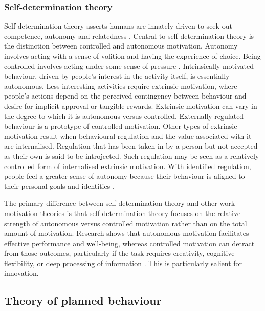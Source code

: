 
\subsubsection{Self-determination theory}

Self-determination theory asserts humans are innately driven to seek out competence, autonomy and relatedness \citep{ryan2000self}. Central to self-determination theory is the distinction between controlled and autonomous motivation. Autonomy involves acting with a sense of volition and having the experience of choice. Being controlled involves acting under some sense of pressure \citep{gagne2005self}. Intrinsically motivated behaviour, driven by people’s interest in the activity itself, is essentially autonomous. Less interesting activities require extrinsic motivation, where people's actions depend on the perceived contingency between behaviour and desire for implicit approval or tangible rewards. Extrinsic motivation can vary in the degree to which it is autonomous versus controlled. Externally regulated behaviour is a prototype of controlled motivation. Other types of extrinsic motivation result when behavioural regulation and the value associated with it are internalised. Regulation that has been taken in by a person but not accepted as their own is said to be introjected. Such regulation may be seen as a relatively controlled form of internalised extrinsic motivation. With identified regulation, people feel a greater sense of autonomy because their behaviour is aligned to their personal goals and identities \citep{gagne2005self}. 

The primary difference between self-determination theory and other work motivation theories is that self-determination theory focuses on the relative strength of autonomous versus controlled motivation rather than on the total amount of motivation. Research shows that autonomous motivation facilitates effective performance and well-being, whereas controlled motivation can detract from those outcomes, particularly if the task requires creativity, cognitive flexibility, or deep processing of information \citep{gagne2005self}. This is particularly salient for innovation.


\subsection{Theory of planned behaviour}

